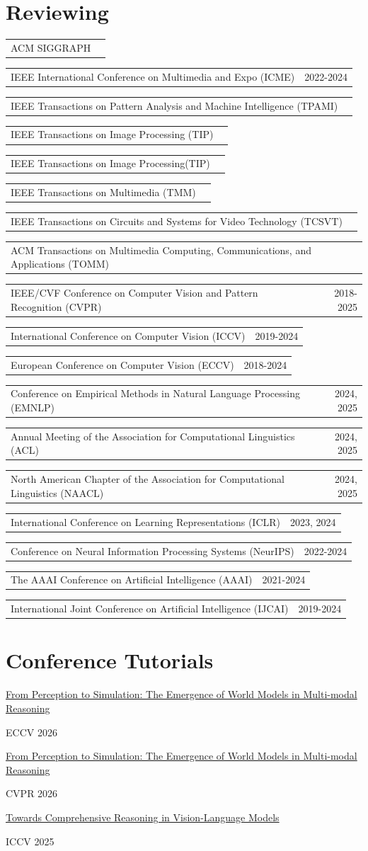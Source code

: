 \documentclass[11pt,letterpaper]{article}
\makeatletter
\newcommand{\cvService}[2]{\par\begin{tabularx}{\linewidth}{@{}Xr@{}}#1 & #2\end{tabularx}\par}
\makeatother
\begin{document}
\section*{Reviewing}
\cvService{ACM SIGGRAPH}{}
\cvService{IEEE International Conference on Multimedia and Expo (ICME)}{2022-2024}
\cvService{IEEE Transactions on Pattern Analysis and Machine Intelligence (TPAMI)}{}
\cvService{IEEE Transactions on Image Processing (TIP)}{}
\cvService{IEEE Transactions on Image Processing(TIP)}{}
\cvService{IEEE Transactions on Multimedia (TMM)}{}
\cvService{IEEE Transactions on Circuits and Systems for Video Technology (TCSVT)}{}
\cvService{ACM Transactions on Multimedia Computing, Communications, and Applications (TOMM)}{}
\cvService{IEEE/CVF Conference on Computer Vision and Pattern Recognition (CVPR)}{2018-2025}
\cvService{International Conference on Computer Vision (ICCV)}{2019-2024}
\cvService{European Conference on Computer Vision (ECCV)}{2018-2024}
\cvService{Conference on Empirical Methods in Natural Language Processing (EMNLP)}{2024, 2025}
\cvService{Annual Meeting of the Association for Computational Linguistics (ACL)}{2024, 2025}
\cvService{North American Chapter of the Association for Computational Linguistics (NAACL)}{2024, 2025}
\cvService{International Conference on Learning Representations (ICLR)}{2023, 2024}
\cvService{Conference on Neural Information Processing Systems (NeurIPS)}{2022-2024}
\cvService{The AAAI Conference on Artificial Intelligence (AAAI)}{2021-2024}
\cvService{International Joint Conference on Artificial Intelligence (IJCAI)}{2019-2024}
\section*{Conference Tutorials}
\href{https://wangywust.github.io/eccv-tutorial-world-model/}{From Perception to Simulation: The Emergence of World Models in Multi-modal Reasoning}\par\nopagebreak
ECCV 2026\par
{}\href{https://wangywust.github.io/cvpr-tutorial-world-model/}{From Perception to Simulation: The Emergence of World Models in Multi-modal Reasoning}\par\nopagebreak
CVPR 2026\par
{}\href{https://wangywust.github.io/iccv-tutorial-reasoning-vlm/}{Towards Comprehensive Reasoning in Vision-Language Models}\par\nopagebreak
ICCV 2025\par
\end{document}
